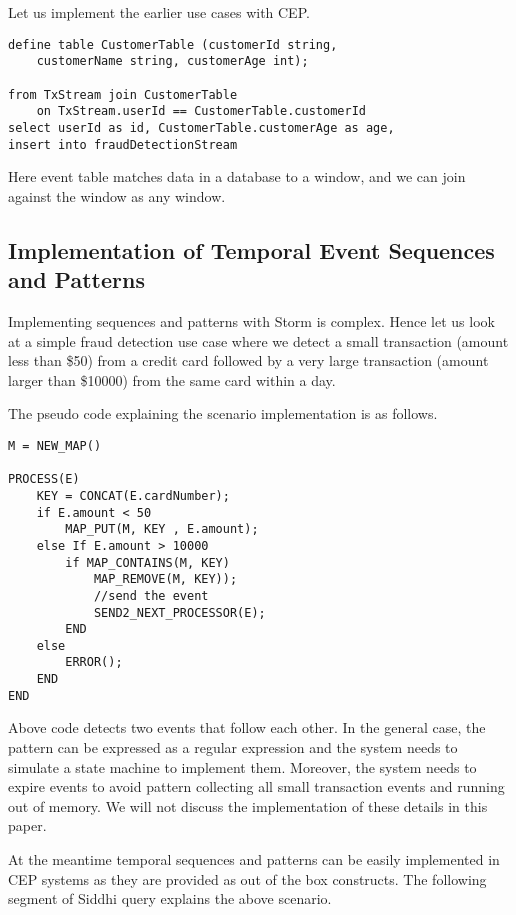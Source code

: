 \documentclass{sig-alternate}
\begin{document}
{Let us implement the earlier use cases with CEP.

\begin{lstlisting}[mathescape, showstringspaces=false]
define table CustomerTable (customerId string, 
	customerName string, customerAge int);

from TxStream join CustomerTable
	on TxStream.userId == CustomerTable.customerId
select userId as id, CustomerTable.customerAge as age, 
insert into fraudDetectionStream
\end{lstlisting} 

Here event table matches data in a database to a window, and we can join against the window as any window.

\subsection{Implementation of Temporal Event Sequences and Patterns}

Implementing sequences and patterns with Storm is complex. Hence let us look at a simple  fraud detection use case where we detect a small transaction (amount less than \$50) from a credit card followed by a very large transaction (amount larger than \$10000) from the same card within a day. 

The pseudo code explaining the scenario implementation is as follows.
 
\begin{lstlisting}[mathescape,showstringspaces=false]
M = NEW_MAP()

PROCESS(E)  
	KEY = CONCAT(E.cardNumber); 
	if E.amount < 50
		MAP_PUT(M, KEY , E.amount); 
	else If E.amount > 10000
		if MAP_CONTAINS(M, KEY)
			MAP_REMOVE(M, KEY));
			//send the event		     
			SEND2_NEXT_PROCESSOR(E); 
		END
	else
		ERROR();
	END	
END
\end{lstlisting}  
 

Above code detects two events that follow each other. In the general case, the pattern can be expressed as a regular expression and the system needs to simulate a state machine to implement them. Moreover, the system needs to expire events to avoid pattern collecting all small transaction events and running out of memory. We will not discuss the implementation of these details in this paper. 

At the meantime  temporal sequences and patterns can be easily implemented in CEP systems as they are provided as out of the box constructs. The following segment of Siddhi query explains the above scenario.


}
\end{document}

